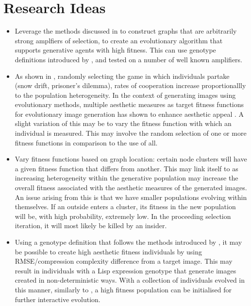 \documentclass[10pt,a4paper]{article}
\begin{document}
\section{Research Ideas}
\begin{itemize}
	\item Leverage the methods discussed in \cite{graph-amplifiers, } to construct graphs that are arbitrarily strong amplfiers of selection, to create an evolutionary algorithm that supports generative agents with high fitness.
	This can use genotype definitions introduced by \cite{sims}, and tested on a number of well known amplifiers.
	
	\item As shown in \cite{mixed-games}, randomly selecting the game in which individuals partake (snow drift, prisoner's dilemma), rates of cooperation increase proportionallly to the population heterogeneity.
	In the context of generating images using evolutionary methods, multiple aesthetic measures as target fitness functions for evolutionary image generation has shown to enhance aesthetic appeal \cite{aesthetic-measures}.
	A slight variation of this may be to vary the fitness function with which an individual is measured.
	This may involve the random selection of one or more fitness functions in comparison to the use of all.
	
	\item Vary fitness functions based on graph location: certain node clusters will have a given fitness function that differs from another.
	This may link itself to \cite{mixed-games} as increasing heterogeneity within the generative population may increase the overall fitness associated with the aesthetic measures of the generated images.
	An issue arising from this is that we have smaller populations evolving within themselves.
	If an outside enters a cluster, its fitness in the new population will be, with high probability, extremely low.
	In the proceeding selection iteration, it will most likely be killed by an insider.
	
	\item Using a genotype definition that follows the methods introduced by \cite{sims}, it may be possible to create high aesthetic fitness individuals by using RMSE/compression complexity difference from a target image. 
	This may result in individuals with a Lisp expression genotype that generate images created in non-deterministic ways.
	With a collection of individuals evolved in this manner, similarly to \cite{nevar}, a high fitness population can be initialised for further interactive evolution.
\end{itemize}

\pagebreak



\end{document}
